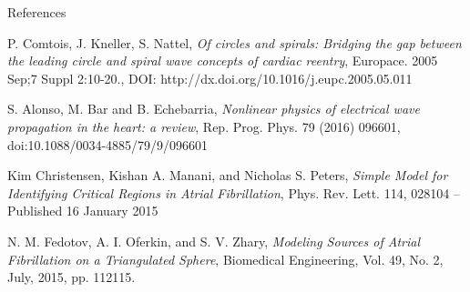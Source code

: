 \documentclass[final,hyperref={pdfpagelabels=false}]{beamer}
\begin{document}
\begin{frame}[t]
\begin{columns}[t]
\begin{column}{.465\textwidth}
\begin{block}{References}
\begin{thebibliography}{1}

\small
{}
P. Comtois, J. Kneller, S. Nattel,
\emph{Of circles and spirals: Bridging the gap between the leading circle and spiral wave concepts of cardiac reentry}, 
Europace. 2005 Sep;7 Suppl 2:10-20., 
DOI: http://dx.doi.org/10.1016/j.eupc.2005.05.011



S. Alonso, M. Bar and B. Echebarria, 
\emph{Nonlinear physics of electrical wave
propagation in the heart: a review},
Rep. Prog. Phys. 79 (2016) 096601, 
doi:10.1088/0034-4885/79/9/096601

Kim Christensen, Kishan A. Manani, and Nicholas S. Peters, 
\emph{Simple Model for Identifying Critical Regions in Atrial Fibrillation}, 
Phys. Rev. Lett. 114, 028104 – Published 16 January 2015



N. M. Fedotov,  A. I. Oferkin, and S. V. Zhary,
\emph{Modeling Sources of Atrial Fibrillation on a Triangulated Sphere}, 
Biomedical Engineering, Vol. 49, No. 2, July, 2015, pp. 112115. 
\end{thebibliography}

\end{block}









\end{column}
\end{columns}
\end{frame}
\end{document}
